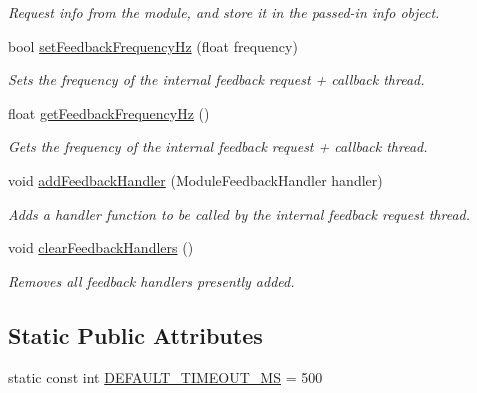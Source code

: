 \begin{DoxyCompactItemize}
\begin{DoxyCompactList}\small\item\em Request info from the module, and store it in the passed-\/in info object. \end{DoxyCompactList}\item 
bool \hyperlink{classhebi_1_1Module_a2d37eac7776c910ca5d5de47cadec3e3}{set\+Feedback\+Frequency\+Hz} (float frequency)
\begin{DoxyCompactList}\small\item\em Sets the frequency of the internal feedback request + callback thread. \end{DoxyCompactList}\item 
float \hyperlink{classhebi_1_1Module_a7c15d50b692a5f92ec41e7b88bab8680}{get\+Feedback\+Frequency\+Hz} ()
\begin{DoxyCompactList}\small\item\em Gets the frequency of the internal feedback request + callback thread. \end{DoxyCompactList}\item 
\mbox{\label{classhebi_1_1Module_aa2d0cb41bbcf3ffd2ea1d86ef98e10aa}} 
void \hyperlink{classhebi_1_1Module_aa2d0cb41bbcf3ffd2ea1d86ef98e10aa}{add\+Feedback\+Handler} (Module\+Feedback\+Handler handler)
\begin{DoxyCompactList}\small\item\em Adds a handler function to be called by the internal feedback request thread. \end{DoxyCompactList}\item 
\mbox{\label{classhebi_1_1Module_a4eebac29798f983c8be20498c03b645a}} 
void \hyperlink{classhebi_1_1Module_a4eebac29798f983c8be20498c03b645a}{clear\+Feedback\+Handlers} ()
\begin{DoxyCompactList}\small\item\em Removes all feedback handlers presently added. \end{DoxyCompactList}\end{DoxyCompactItemize}
\subsection*{Static Public Attributes}
\begin{DoxyCompactItemize}
\item 
static const int \hyperlink{classhebi_1_1Module_afba0d28ff83c8ddabd8f6490e412c821}{D\+E\+F\+A\+U\+L\+T\+\_\+\+T\+I\+M\+E\+O\+U\+T\+\_\+\+MS} = 500
\end{DoxyCompactItemize}
